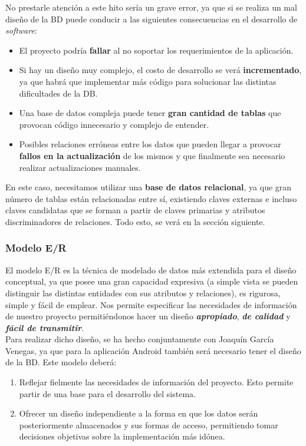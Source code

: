 No prestarle atención a este hito sería un grave error, ya que si se realiza un mal diseño
de la BD puede conducir a las siguientes consecuencias en el desarrollo de \textit{software}:

    \begin{itemize}
        \item El proyecto podría \textbf{fallar} al no soportar los requerimientos de la
        aplicación.
        \item Si hay un diseño muy complejo, el costo de desarrollo se verá
        \textbf{incrementado}, ya que habrá que implementar más código para solucionar las
        distintas dificultades de la DB.
        \item Una base de datos compleja puede tener \textbf{gran cantidad de tablas} que 
        provocan código innecesario y complejo de entender.
        \item Posibles relaciones erróneas entre los datos que pueden llegar a provocar
        \textbf{fallos en la actualización} de los mismos y que finalmente sea necesario realizar
        actualizaciones manuales.
    \end{itemize}

En este caso, necesitamos utilizar una \textbf{base de datos relacional}, ya que gran número
de tablas están relacionadas entre sí, existiendo claves externas e incluso claves
candidatas que se forman a partir de claves primarias y atributos discriminadores de
relaciones. Todo esto, se verá en la sección siguiente.

    \subsubsection{Modelo E/R}
    El modelo E/R es la técnica de modelado de datos más extendida para el diseño
    conceptual, ya que posee una gran capacidad expresiva (a simple vista se pueden
    distinguir las distintas entidades con sus atributos y relaciones), es rigurosa, simple
    y fácil de emplear. Nos permite especificar las necesidades de información de nuestro
    proyecto permitiéndonos hacer un diseño \textbf{\textit{apropiado}},
    \textbf{\textit{de calidad}} y \textbf{\textit{fácil de transmitir}}.\\

    Para realizar dicho diseño, se ha hecho conjuntamente con Joaquín García Venegas,
    ya que para la aplicación Android también será necesario tener el diseño de la BD.
    Este modelo deberá:

        \begin{enumerate}
            \item Reflejar fielmente las necesidades de información del proyecto. Esto
            permite partir de una base para el desarrollo del sistema.
            \item Ofrecer un diseño independiente a la forma en que los datos serán
            posteriormente almacenados y sus formas de acceso, permitiendo tomar decisiones
            objetivas sobre la implementación más idónea.
        \end{enumerate}


